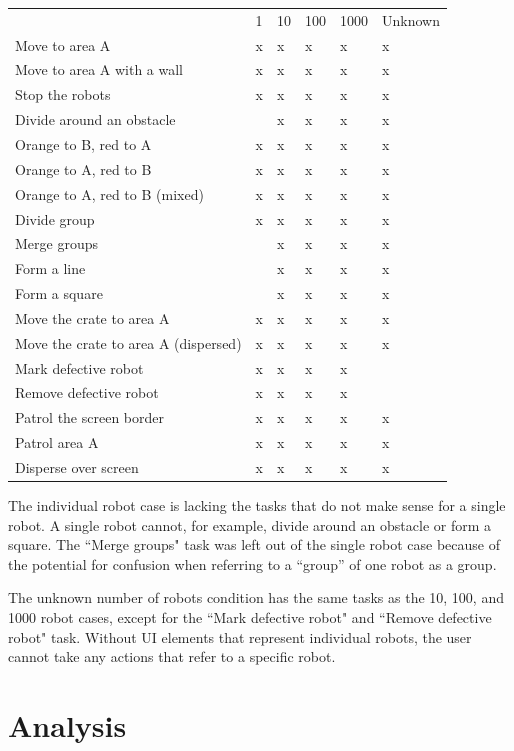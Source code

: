 \documentclass[]{article}
\begin{document}
\begin{tabular}{l|l|l|l|l|l}
& 1 & 10 & 100 & 1000 & Unknown \\
Move to area A & x & x & x & x & x\\
Move to area A with a wall & x & x & x & x & x \\
Stop the robots & x & x & x & x & x\\
Divide around an obstacle & & x & x & x & x \\
Orange to B, red to A & x & x & x & x & x \\
Orange to A, red to B & x & x & x & x & x \\
Orange to A, red to B (mixed) & x & x & x & x & x \\
Divide group & x & x & x & x & x \\
Merge groups & & x & x & x & x \\
Form a line & & x & x & x & x \\
Form a square & & x & x & x & x \\
Move the crate to area A & x & x & x & x & x \\
Move the crate to area A (dispersed) & x & x & x & x & x\\
Mark defective robot & x & x & x & x & \\
Remove defective robot & x & x & x & x &  \\
Patrol the screen border & x & x & x & x & x \\
Patrol area A & x & x & x & x & x \\
Disperse over screen & x & x & x & x & x \\
\end{tabular}

The individual robot case is lacking the tasks that do not make sense for a single robot. A single robot cannot, for example, divide around an obstacle or form a square. 
The ``Merge groups" task was left out of the single robot case because of the potential for confusion when referring to a ``group'' of one robot as a group. 

The unknown number of robots condition has the same tasks as the 10, 100, and 1000 robot cases, except for the ``Mark defective robot" and ``Remove defective robot" task. 
Without UI elements that represent individual robots, the user cannot take any actions that refer to a specific robot. 


\section{Analysis}
\end{document}
